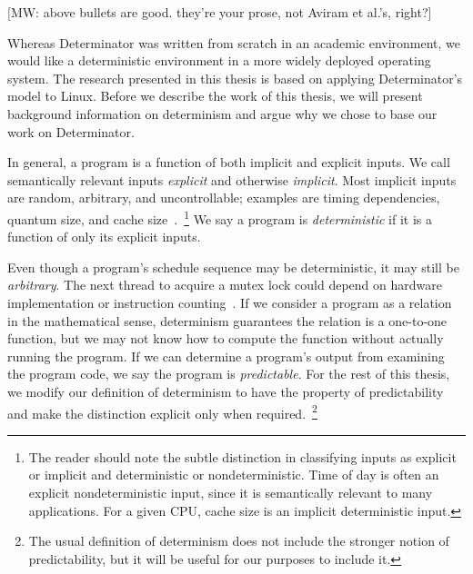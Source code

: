 [MW: above bullets are good. they're your prose, not Aviram et al.'s,
right?]

\fi

\iffalse
# The state of parallel programming and nondeterminism
* As processes move from single to multiple cores, more and more applications
  are written parallel.
* Today, the dominant parallel programming model is nondeterministic. In this
  model:
* Threads share address space, file system, and other globally visible
  resources and
* The OS is free to schedule threads arbitrarily and lock abstractions are not
  deterministic or predictable.
* This model is popular despite drawbacks:
* Data races and lock abstractions introduce bugs and deadlock,
* Programmers spend a lot of time eliminating nondeterminism (data races) using
  unpredictable synchronization primitives,
* Programmers must worry about hardware side effects like ordering of committing
  memory operations,
* Debugging and quality assurance are difficult without repeatability.
\fi

Whereas Determinator was written from scratch in an academic environment,
we would like a deterministic environment in a more widely deployed operating
system. The research presented in this thesis is based on applying
Determinator's model to Linux. Before we describe the work of this thesis, we
will present background information on determinism and argue why we chose to
base our work on Determinator.

In general, a program is a function of both implicit and explicit inputs.
We call semantically relevant inputs \emph{explicit} and otherwise
\emph{implicit}. Most implicit inputs are
random, arbitrary, and uncontrollable; examples are timing dependencies, quantum
size, and cache size~\cite{Bergan11}.~\footnote{The reader should note the
subtle distinction in classifying inputs as explicit or implicit and
deterministic or nondeterministic. Time of day is often an explicit
nondeterministic input, since it is semantically relevant to many applications.
For a given CPU, cache size is an implicit deterministic input.}
We say a program is \emph{deterministic}
if it is a function of only its explicit inputs.

Even though a program's schedule
sequence may be deterministic, it may still be \emph{arbitrary}. The next
thread to acquire a mutex lock could depend on hardware implementation or
instruction counting~\cite{olszewski2009kendo}. If we consider a program
as a relation in the
mathematical sense, determinism guarantees the relation is a one-to-one
function, but we may not know how to compute the function without actually
running the program. If we can determine a program's output from examining the
program code, we say the program is \emph{predictable}. For the rest of this
thesis, we modify our definition of determinism to have the property of
predictability and make the distinction explicit only when
required.~\footnote{The usual definition of determinism does not include the
stronger notion of predictability, but it will be useful for our purposes to
include it.}

